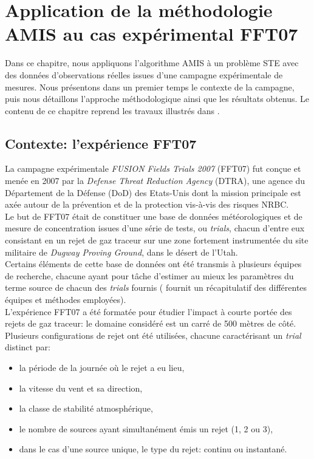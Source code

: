 
\setcounter{chapter}{2}


\chapter{{Application de la méthodologie AMIS au cas expérimental FFT07}}

Dans ce chapitre, nous appliquons l'algorithme AMIS à un problème STE avec des données d'observations réelles issues d'une campagne expérimentale de mesures. Nous présentons dans un premier temps le contexte de la campagne, puis nous détaillons l'approche méthodologique ainsi que les résultats obtenus. Le contenu de ce chapitre reprend les travaux illustrés dans \cite{Rajaona2015}.

\section{Contexte: l'expérience FFT07}

La campagne expérimentale \textit{FUSION Fields Trials 2007} (FFT07) fut conçue et menée en 2007 par la \textit{Defense Threat Reduction Agency} (DTRA), une agence du Département de la Défense (DoD) des Etats-Unis dont la mission principale est axée autour de la prévention et de la protection vis-à-vis des risques NRBC.\\

Le but de FFT07 était de constituer une base de données météorologiques et de mesure de concentration issues d'une série de tests, ou \textit{trials}, chacun d'entre eux consistant en un rejet de gaz traceur sur une zone fortement instrumentée du site militaire de \textit{Dugway Proving Ground}, dans le désert de l'Utah.\\

Certains éléments de cette base de données ont été transmis à plusieurs équipes de recherche, chacune ayant pour tâche d'estimer au mieux les paramètres du terme source de chacun des \textit{trials} fournis (\cite{Platt2010} fournit un récapitulatif des différentes équipes et méthodes employées).\\

L'expérience FFT07 a été formatée pour étudier l'impact à courte portée des rejets de gaz traceur: le domaine considéré est un carré de 500 mètres de côté. Plusieurs configurations de rejet ont été utilisées, chacune caractérisant un \textit{trial} distinct par:
\begin{itemize}
	\item la période {de la journée} où le rejet a eu lieu,
	\item la vitesse du vent et sa direction,
	\item la classe de stabilité atmosphérique,
	\item le nombre de sources ayant simultanément émis un rejet (1, 2 ou 3),
	\item dans le cas d'une source unique, le type du rejet: continu ou instantané.\\
\end{itemize}

